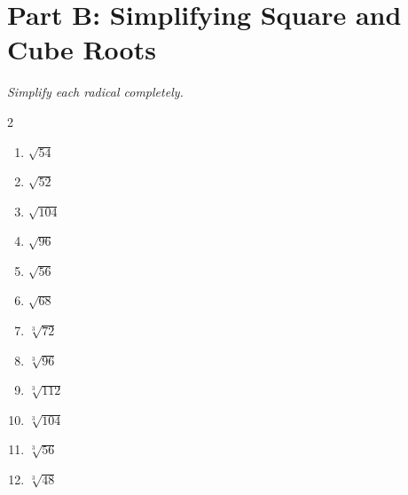 \documentclass[11pt]{article}
\begin{document}
\section*{Part B: Simplifying Square and Cube Roots}
\noindent\textit{Simplify each radical completely.}
\begin{multicols}{2}
\begin{enumerate}
  \item $\sqrt{54}$
  \vspace{0.9cm}
  \item $\sqrt{52}$
  \vspace{0.9cm}
  \item $\sqrt{104}$
  \vspace{0.9cm}
  \item $\sqrt{96}$
  \vspace{0.9cm}
  \item $\sqrt{56}$
  \vspace{0.9cm}
  \item $\sqrt{68}$
  \vspace{0.9cm}
  \item $\sqrt[3]{72}$
  \vspace{0.9cm}
  \item $\sqrt[3]{96}$
  \vspace{0.9cm}
  \item $\sqrt[3]{112}$
  \vspace{0.9cm}
  \item $\sqrt[3]{104}$
  \vspace{0.9cm}
  \item $\sqrt[3]{56}$
  \vspace{0.9cm}
  \item $\sqrt[3]{48}$
  \vspace{0.9cm}
\end{enumerate}
\end{multicols}
\end{document}

